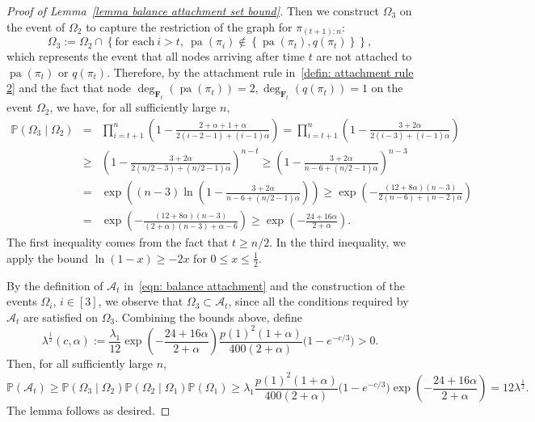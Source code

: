 \documentclass[twoside,11pt]{article}
\theoremstyle{remark}
\begin{document}
\begin{proof}[Proof of Lemma~\ref{lemma balance attachment set bound}]
Then we construct $\Omega_3$ on the event of $\Omega_2$ to capture the restriction of the graph for $\pi_{(t+1):n}$:
%
\begin{equation*}
\Omega_3:=\Omega_2\cap \left\{\text{for each}\ i> t, \ \operatorname{pa}\left(\pi_i \right)\notin \left\{\operatorname{pa}(\pi_t), q(\pi_t)\right\} \right\},     
\end{equation*}
%
which represents the event that all nodes arriving after time $t$ 
are not attached to $\operatorname{pa}(\pi_t)$ or $q(\pi_t)$.
Therefore, by the attachment rule in~\eqref{defin: attachment rule 2} and the fact that node $\operatorname{deg}_{\bm{F}_{t}}\left(\operatorname{pa}(\pi_t)\right)=2, \operatorname{deg}_{\bm{F}_{t}}\left(q(\pi_t)\right)=1$ on the event $\Omega_2$,
we have, for all sufficiently large $n$,
%
\begingroup
\begin{eqnarray*}
\mathbb{P}\left(\Omega_3\mid \Omega_2\right)&=&\prod^{n}_{i=t+1}\left(1-\frac{ 2 + \alpha+1+\alpha}{2(i-2-1) + (i-1)\alpha}\right)=\prod^{n}_{i=t+1}\left(1-\frac{ 3 + 2\alpha}{2(i-3) + (i-1)\alpha}\right)\\
&\geq &
\left(1-\frac{ 3 + 2\alpha}{2(n/2-3) + (n/2-1)\alpha}\right)^{n-t} \geq \left(1-\frac{ 3 + 2\alpha}{n-6 + (n/2-1)\alpha}\right)^{n-3}\\
&=&  \exp\left(\left(n-3\right)\ln\left(1-\frac{ 3 + 2\alpha}{n-6 + (n/2-1)\alpha}\right)\right)\geq  \exp\left(-\frac{\left(12+8\alpha\right)\left(n-3\right)}{2\left(n-6\right) + \left(n-2\right)\alpha}\right)\\
&=&\exp\left(-\frac{\left(12+8\alpha\right)\left(n-3\right)}{\left(2+\alpha\right)\left(n-3\right) + \alpha-6}\right)\geq \exp\left(-\frac{24+16\alpha}{2+\alpha}\right).
\end{eqnarray*}
\endgroup
%
The first inequality comes from the fact that $t\geq n/2$.
In the third inequality, we apply the bound 
$\ln(1 - x) \ge -2x$ for $0\le x \le \frac{1}{2}$.

By the definition of $\mathcal{A}_t$ in~\eqref{eqn: balance attachment} 
and the construction of the events $\Omega_i$, $i \in [3]$, 
we observe that $\Omega_3 \subset \mathcal{A}_t$, 
since all the conditions required by $\mathcal{A}_t$ are satisfied on $\Omega_3$.  
Combining the bounds above, define
%
\begin{equation*}
\lambda^{\frac12}(c,\alpha)
:=\frac{\lambda_1}{12}
\exp\left(-\frac{24+16\alpha}{2+\alpha}\right)\frac{p(1)^2(1+\alpha)}{400(2+\alpha)}
\bigl(1-e^{-c/3}\bigr)>0.
\end{equation*}
%
Then, for all sufficiently large $n$,
%
\begin{equation*}
\mathbb P(\mathcal A_t)
\geq\mathbb P(\Omega_3\mid\Omega_2)
\mathbb P(\Omega_2\mid\Omega_1)\mathbb P(\Omega_1)
\geq\lambda_1\frac{p(1)^2(1+\alpha)}{400(2+\alpha)}
\bigl(1-e^{-c/3}\bigr)\exp\left(-\frac{24+16\alpha}{2+\alpha}\right)
=12\lambda^{\frac12}.
\end{equation*}
%
The lemma follows as desired.
\end{proof}
\end{document}
